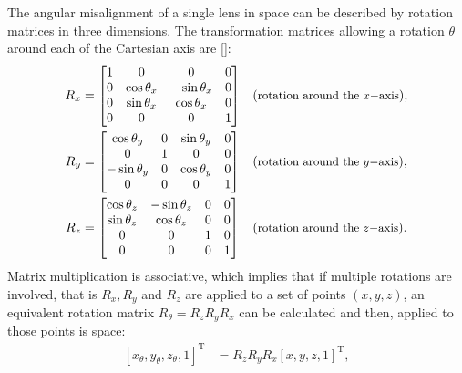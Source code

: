 \begin{refsection}
The angular misalignment of a single lens in space can be described by rotation matrices in three dimensions. The transformation matrices allowing a rotation $\theta$ around each of the Cartesian axis are [\cite[\textit{§C}]{House2016}]:
\begin{subequations}\label{eq:affine}
    \begin{align}
        R_x &= \begin{bmatrix}
                            1 & 0 & 0 &0\\
                            0 & \cos\theta_x & -\sin{\theta_x}  &0\\
                            0 & \sin\theta_x & \cos\theta_x &0\\
                            0 & 0 & 0 &1
            \end{bmatrix}  &&(\small{\text{rotation around the $x-$axis}}),\\
            R_y &= \begin{bmatrix}
                            \cos\theta_y & 0 & \sin\theta_y &0\\
                            0 & 1 & 0 &0\\
                            -\sin\theta_y & 0 & \cos\theta_y &0\\
                            0 & 0 & 0 &1
            \end{bmatrix}  &&(\small{\text{rotation around the $y-$axis}}),\\
            R_z &= \begin{bmatrix}
                            \cos\theta_z & -\sin\theta_z & 0 &0\\
                            \sin\theta_z & \cos\theta_z & 0 &0\\
                            0 & 0 & 1 &0\\
                            0 & 0 & 0 &1
            \end{bmatrix}  &&(\small{\text{rotation around the $z-$axis}}).
    \end{align}
\end{subequations}{}
Matrix multiplication is associative, which implies that if multiple rotations are involved, that is $R_x, R_y$ and $R_z$ are applied to a set of points $(x,y,z)$, an equivalent rotation matrix $R_{\theta}=R_zR_yR_x$ can be calculated and then, applied to those points is space: 
\begin{align}\label{eq:affine2}
    [x_\theta,y_\theta,z_\theta,1]^\text{T} & = R_zR_yR_x[x,y,z,1]^\text{T},\nonumber \\

\end{align}
\end{refsection}

